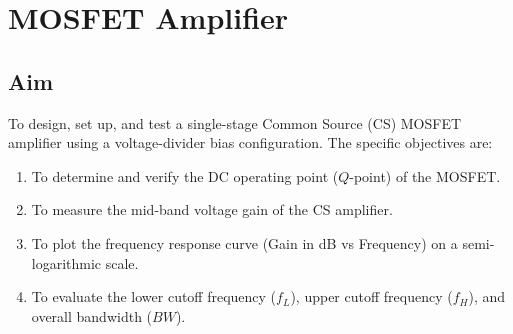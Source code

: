 
\chapter{MOSFET Amplifier}

\section{Aim}
To design, set up, and test a single-stage Common Source (CS) MOSFET amplifier using a voltage-divider bias configuration. The specific objectives are:
\begin{enumerate}
	\item To determine and verify the DC operating point ($Q$-point) of the MOSFET.
	\item To measure the mid-band voltage gain of the CS amplifier.
	\item To plot the frequency response curve (Gain in dB vs Frequency) on a semi-logarithmic scale.
	\item To evaluate the lower cutoff frequency ($f_L$), upper cutoff frequency ($f_H$), and overall bandwidth ($BW$).
\end{enumerate}


